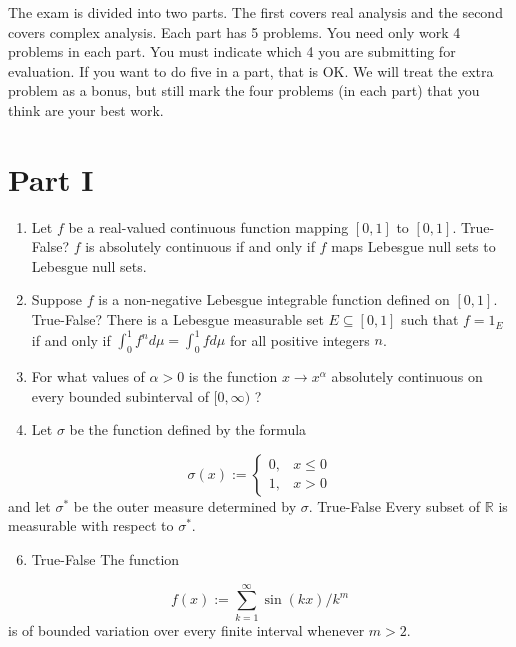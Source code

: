 \documentclass[10pt]{article}
\begin{document}
The exam is divided into two parts. The first covers real analysis and the second covers complex analysis. Each part has 5 problems. You need only work 4 problems in each part. You must indicate which 4 you are submitting for evaluation. If you want to do five in a part, that is OK. We will treat the extra problem as a bonus, but still mark the four problems (in each part) that you think are your best work.

\section{Part I}
\begin{enumerate}
  \item Let $f$ be a real-valued continuous function mapping $[0,1]$ to $[0,1]$. True-False? $f$ is absolutely continuous if and only if $f$ maps Lebesgue null sets to Lebesgue null sets.

  \item Suppose $f$ is a non-negative Lebesgue integrable function defined on $[0,1]$. True-False? There is a Lebesgue measurable set $E \subseteq[0,1]$ such that $f=1_{E}$ if and only if $\int_{0}^{1} f^{n} d \mu=\int_{0}^{1} f d \mu$ for all positive integers $n$.

  \item For what values of $\alpha>0$ is the function $x \rightarrow x^{\alpha}$ absolutely continuous on every bounded subinterval of $[0, \infty)$ ?

  \item Let $\sigma$ be the function defined by the formula

\end{enumerate}
$$
\sigma(x):= \begin{cases}0, & x \leq 0 \\ 1, & x>0\end{cases}
$$
and let $\sigma^{*}$ be the outer measure determined by $\sigma$. True-False Every subset of $\mathbb{R}$ is measurable with respect to $\sigma^{*}$.

\begin{enumerate}
  \setcounter{enumi}{5}
  \item True-False The function
\end{enumerate}
$$
f(x):=\sum_{k=1}^{\infty} \sin (k x) / k^{m}
$$
is of bounded variation over every finite interval whenever $m>2$.
\end{document}

